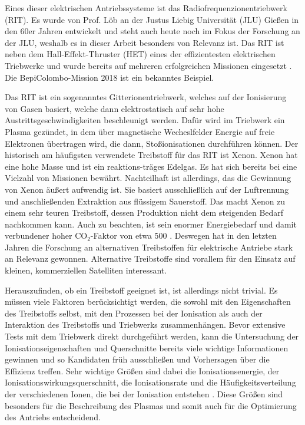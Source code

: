 Eines dieser elektrischen Antriebssysteme ist das Radiofrequenzionentriebwerk (RIT). Es wurde von Prof. Löb an der Justus Liebig Universität (JLU) Gießen in den 60er Jahren entwickelt und steht auch heute noch im Fokus der Forschung an der JLU, weshalb es in dieser Arbeit besonders von Relevanz ist. Das RIT ist neben dem Hall-Effekt-Thruster (HET) eines der effizientesten elektrischen Triebwerke und wurde bereits auf mehreren erfolgreichen Missionen eingesetzt \cite[S. 6]{ion}. Die BepiColombo-Mission 2018 ist ein bekanntes Beispiel.

Das RIT ist ein sogenanntes Gitterionentriebwerk, welches auf der Ionisierung von Gasen basiert, welche dann elektrostatisch auf sehr hohe Austrittsgeschwindigkeiten beschleunigt werden. Dafür wird im Triebwerk ein Plasma gezündet, in dem über magnetische Wecheslfelder Energie auf freie Elektronen übertragen wird, die dann, Stoßionisationen durchführen können. Der historisch am häufigsten verwendete Treibstoff für das RIT ist Xenon. Xenon hat eine hohe Masse und ist ein reaktions-träges Edelgas. Es hat sich bereits bei eine Vielzahl von Missionen bewährt. Nachteilhaft ist allerdings, das die Gewinnung von Xenon äußert aufwendig ist. Sie basiert ausschließlich auf der Luftrennung und anschließenden Extraktion aus flüssigem Sauerstoff. Das macht Xenon zu einem sehr teuren Treibstoff, dessen Produktion nicht dem steigenden Bedarf nachkommen kann. Auch zu beachten, ist sein enormer Energiebedarf und damit verbundener hoher CO$_2$-Faktor von etwa 500 \cite{CO2}. Deswegen hat in den letzten Jahren die Forschung an alternativen Treibstoffen für elektrische Antriebe stark an Relevanz gewonnen. Alternative Treibstoffe sind vorallem für den Einsatz auf kleinen, kommerziellen Satelliten interessant. 

Herauszufinden, ob ein Treibstoff geeignet ist, ist allerdings nicht trivial. Es müssen viele Faktoren berücksichtigt werden, die sowohl mit den Eigenschaften des Treibstoffs selbst, mit den Prozessen bei der Ionisation als auch der Interaktion des Treibstoffs und Triebwerks zusammenhängen. Bevor extensive Tests mit dem Triebwerk direkt durchgeführt werden, kann die Untersuchung der Ionisationseigenschaften und Querschnitte bereits viele wichtige Informationen gewinnen und so Kandidaten früh ausschließen und Vorhersagen über die Effizienz treffen. Sehr wichtige Größen sind dabei die Ionisationsenergie, der Ionisationswirkungsquerschnitt, die Ionisationsrate und die Häufigkeitsverteilung der verschiedenen Ionen, die bei der Ionisation entstehen \cite{ion}. Diese Größen sind besonders für die Beschreibung des Plasmas und somit auch für die Optimierung des Antriebs entscheidend. 

